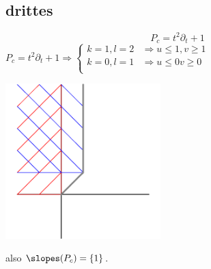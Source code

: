 \subsection{drittes}

\[
  P_c=t^2\partial_t+1
\]
$
P_c=t^2\partial_t+1
\Rightarrow
\begin{cases}
  k=1, l=2 & \Rightarrow u \leq 1, v \geq 1\\
  k=0, l=1 & \Rightarrow u \leq 0  v \geq 0\\
\end{cases}
$
\begin{center}
  \includegraphics[width=6cm]{img/c.png}
\end{center}

also $\slopes(P_c)=\{1\}$.


